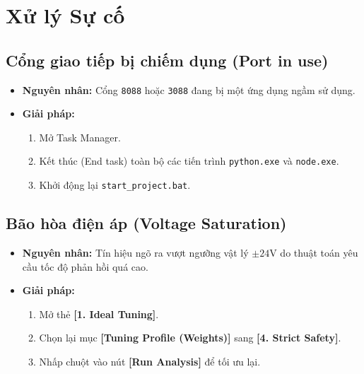 \documentclass[12pt,a4paper]{article}
\begin{document}
\section{Xử lý Sự cố}

\subsection{Cổng giao tiếp bị chiếm dụng (Port in use)}
\begin{itemize}
    \item \textbf{Nguyên nhân:} Cổng \texttt{8088} hoặc \texttt{3088} đang bị một ứng dụng ngầm sử dụng.
    \item \textbf{Giải pháp:} 
    \begin{enumerate}
        \item Mở Task Manager.
        \item Kết thúc (End task) toàn bộ các tiến trình \texttt{python.exe} và \texttt{node.exe}.
        \item Khởi động lại \texttt{start\_project.bat}.
    \end{enumerate}
\end{itemize}

\subsection{Bão hòa điện áp (Voltage Saturation)}
\begin{itemize}
    \item \textbf{Nguyên nhân:} Tín hiệu ngõ ra vượt ngưỡng vật lý $\pm 24\text{V}$ do thuật toán yêu cầu tốc độ phản hồi quá cao.
    \item \textbf{Giải pháp:} 
    \begin{enumerate}
        \item Mở thẻ \textbf{[1. Ideal Tuning]}.
        \item Chọn lại mục \textbf{[Tuning Profile (Weights)]} sang \textbf{[4. Strict Safety]}.
        \item Nhấp chuột vào nút \textbf{[Run Analysis]} để tối ưu lại.
    \end{enumerate}
\end{itemize}
\end{document}
